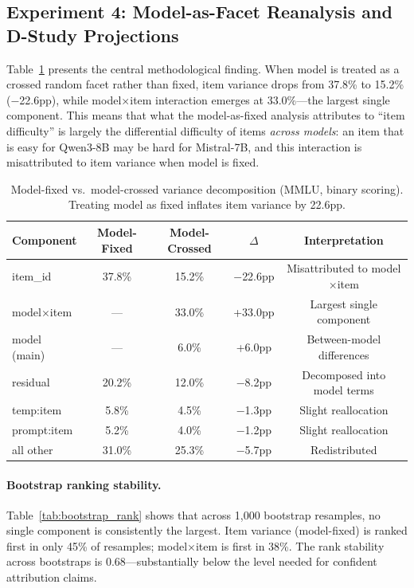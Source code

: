\documentclass[11pt]{article}
\begin{document}
\subsection{Experiment 4: Model-as-Facet Reanalysis and D-Study Projections}
\label{sec:exp4}

Table~\ref{tab:model_crossed} presents the central methodological finding.
When model is treated as a crossed random facet rather than fixed, item variance drops from 37.8\% to 15.2\% ($-$22.6pp), while model$\times$item interaction emerges at 33.0\%---the largest single component.
This means that what the model-as-fixed analysis attributes to ``item difficulty'' is largely the differential difficulty of items \emph{across models}: an item that is easy for Qwen3-8B may be hard for Mistral-7B, and this interaction is misattributed to item variance when model is fixed.

\begin{table}[t]
\centering
\caption{Model-fixed vs.\ model-crossed variance decomposition (MMLU, binary scoring). Treating model as fixed inflates item variance by 22.6pp.}
\label{tab:model_crossed}
\begin{tabular}{lcccc}
\toprule
Component & Model-Fixed & Model-Crossed & $\Delta$ & Interpretation \\
\midrule
item\_id        & 37.8\% & 15.2\% & $-$22.6pp & Misattributed to model$\times$item \\
model$\times$item & ---  & 33.0\% & +33.0pp  & Largest single component \\
model (main)    & ---    & 6.0\%  & +6.0pp   & Between-model differences \\
residual        & 20.2\% & 12.0\% & $-$8.2pp & Decomposed into model terms \\
temp:item       & 5.8\%  & 4.5\%  & $-$1.3pp & Slight reallocation \\
prompt:item     & 5.2\%  & 4.0\%  & $-$1.2pp & Slight reallocation \\
all other       & 31.0\% & 25.3\% & $-$5.7pp & Redistributed \\
\bottomrule
\end{tabular}
\end{table}

\paragraph{Bootstrap ranking stability.}
Table~\ref{tab:bootstrap_rank} shows that across 1{,}000 bootstrap resamples, no single component is consistently the largest.
Item variance (model-fixed) is ranked first in only 45\% of resamples; model$\times$item is first in 38\%.
The rank stability across bootstraps is 0.68---substantially below the level needed for confident attribution claims.
\end{document}
